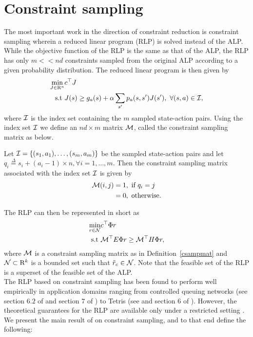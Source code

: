 \section{Constraint sampling}
The most important work in the direction of constraint reduction is constraint sampling \cite{CS} wherein a reduced linear program (RLP) is solved instead of the ALP. While the objective function of the RLP is the same as that of the ALP, the RLP has only $m<<nd$ constraints sampled from the original ALP according to a given probability distribution. The reduced linear program is then given by
\small
\begin{align}\label{rlp}
\min_{J\in \mathrm{R}^n} &c^\top J\nonumber\\
\text{s.t}\mbox{ } &J(s)\geq g_a(s)+\alpha\sum_{s'}p_a(s,s')J(s'), \mbox{ }\forall (s,a) \in \mathcal{I},
\end{align}
\normalsize
where $\mathcal{I}$ is the index set containing the $m$ sampled state-action pairs. Using the index set $\mathcal{I}$ we define an $nd\times m$ matrix $\mathcal{M}$, called the constraint sampling matrix as below.
\begin{definition}\label{csampmat}
Let $\mathcal{I}=\{(s_1,a_1),\ldots,(s_m,a_m)\}$ be the sampled state-action pairs and let $q_i\stackrel{\Delta}{=}s_i+(a_i-1)\times n,\forall i=1,\ldots,m$. Then the constraint sampling matrix associated with the index set $\mathcal{I}$ is given by
\begin{align}
\mathcal{M}(i,j)&=1, \mbox{ }\text{if}\mbox{ } q_i=j\nonumber\\
&=0, \mbox{ }\text{otherwise}.
\end{align}
\end{definition}
The RLP can then be represented in short as
\begin{align}\label{rlpshort}
\min_{r\in \mathcal{N}} &c^\top \Phi r\nonumber\\
\text{s.t}\mbox{ } & \mathcal{M}^\top E \Phi r \geq \mathcal{M}^\top H \Phi r,
\end{align}
where $\mathcal{M}$ is a constraint sampling matrix as in Definition~\ref{csampmat} and $\mathcal{N}\subset \mathrm{R}^k$ is a bounded set such that $\tilde{r}_c \in \mathcal{N}$. Note that the feasible set of the RLP is a superset of the feasible set of the ALP.\\
The RLP based on constraint sampling has been found to perform well empirically in application domains ranging from controlled queuing networks (see section $6.2$ of \cite{ALP} and section $7$ of \cite{SALP}) to Tetris (see \cite{CST} and section $6$ of \cite{SALP}). However, the theoretical guarantees for the RLP are available only under a restricted setting \cite{CS}. We present the main result of \cite{CS} on constraint sampling, and to that end define the following:
